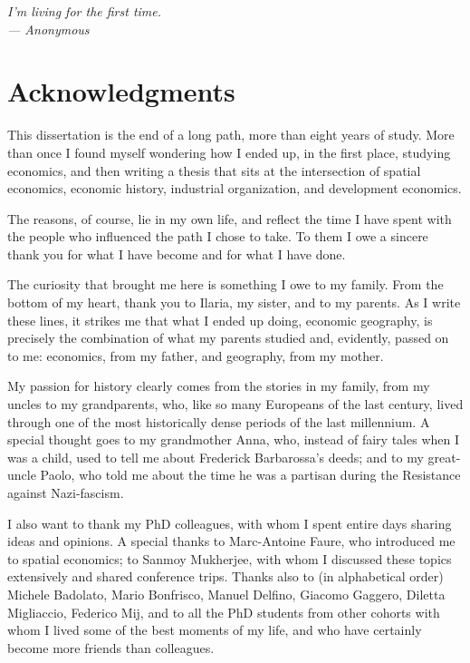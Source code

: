 \begin{flushright}{\slshape    
    I’m living for the first time. \\ \medskip
    --- Anonymous}
\end{flushright}
\bigskip
\begingroup
\let\clearpage\relax
\let\cleardoublepage\relax
\let\cleardoublepage\relax
\chapter*{Acknowledgments}

This dissertation is the end of a long path, more than eight years of study. More than once I found myself wondering how I ended up, in the first place, studying economics, and then writing a thesis that sits at the intersection of spatial economics, economic history, industrial organization, and development economics.

The reasons, of course, lie in my own life, and reflect the time I have spent with the people who influenced the path I chose to take. To them I owe a sincere thank you for what I have become and for what I have done.

The curiosity that brought me here is something I owe to my family. From the bottom of my heart, thank you to Ilaria, my sister, and to my parents. As I write these lines, it strikes me that what I ended up doing, economic geography, is precisely the combination of what my parents studied and, evidently, passed on to me: economics, from my father, and geography, from my mother.

My passion for history clearly comes from the stories in my family, from my uncles to my grandparents, who, like so many Europeans of the last century, lived through one of the most historically dense periods of the last millennium. A special thought goes to my grandmother Anna, who, instead of fairy tales when I was a child, used to tell me about Frederick Barbarossa's deeds; and to my great-uncle Paolo, who told me about the time he was a partisan during the Resistance against Nazi-fascism.

I also want to thank my PhD colleagues, with whom I spent entire days sharing ideas and opinions. A special thanks to Marc-Antoine Faure, who introduced me to spatial economics; to Sanmoy Mukherjee, with whom I discussed these topics extensively and shared conference trips. Thanks also to (in alphabetical order) Michele Badolato, Mario Bonfrisco, Manuel Delfino, Giacomo Gaggero, Diletta Migliaccio, Federico Mij, and to all the PhD students from other cohorts with whom I lived some of the best moments of my life, and who have certainly become more friends than colleagues.

